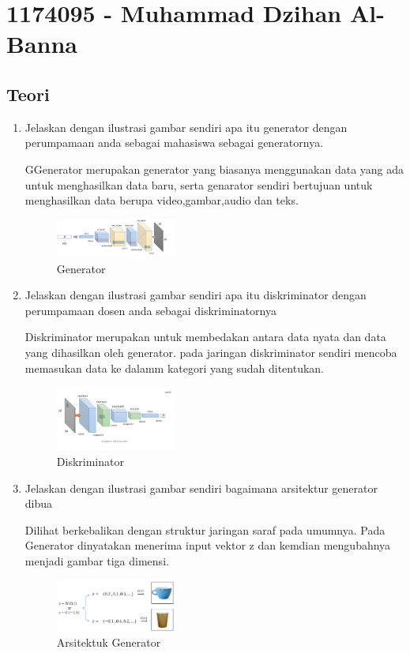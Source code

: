 \section{1174095 - Muhammad Dzihan Al-Banna}
    \subsection{Teori}
        \begin{enumerate}
            \item Jelaskan dengan ilustrasi gambar sendiri apa itu generator dengan perumpamaan anda sebagai mahasiswa sebagai generatornya.
            \par GGenerator merupakan generator yang biasanya menggunakan data yang ada untuk menghasilkan data baru, serta genarator sendiri bertujuan untuk menghasilkan data berupa video,gambar,audio dan teks.
            \begin{figure}[H]
                \includegraphics[width=4cm]{figures/1174095/chapter8/teori1.jpg}
             \centering
             \caption{Generator}
            \end{figure}

            \item Jelaskan dengan ilustrasi gambar sendiri apa itu diskriminator dengan perumpamaan dosen anda sebagai diskriminatornya
            \par Diskriminator merupakan untuk membedakan antara data nyata dan data yang dihasilkan oleh generator. pada jaringan diskriminator sendiri mencoba memasukan data ke dalamm kategori yang sudah ditentukan.

            \begin{figure}[H]
                \includegraphics[width=4cm]{figures/1174095/chapter8/teori2.jpg}
                \centering
                  \caption{Diskriminator}
            \end{figure}

            \item Jelaskan dengan ilustrasi gambar sendiri bagaimana arsitektur generator dibua
            \par Dilihat berkebalikan dengan struktur jaringan saraf pada umumnya. Pada Generator dinyatakan menerima input vektor z dan kemdian mengubahnya menjadi gambar tiga dimensi.
            \begin{figure}[H]
                \includegraphics[width=4cm]{figures/1174095/chapter8/teori3.PNG}
                \centering
                  \caption{Arsitektuk Generator}
            \end{figure}


\end{enumerate}

